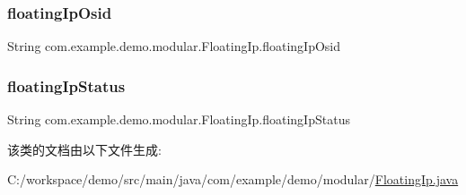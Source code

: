 \subsubsection{\texorpdfstring{floating\+Ip\+Osid}{floatingIpOsid}}
{\footnotesize\ttfamily String com.\+example.\+demo.\+modular.\+Floating\+Ip.\+floating\+Ip\+Osid\hspace{0.3cm}{\ttfamily [private]}}

\mbox{\label{classcom_1_1example_1_1demo_1_1modular_1_1_floating_ip_a5775e23db8a5f08b9ea99ca9ed55be12}} 
\subsubsection{\texorpdfstring{floating\+Ip\+Status}{floatingIpStatus}}
{\footnotesize\ttfamily String com.\+example.\+demo.\+modular.\+Floating\+Ip.\+floating\+Ip\+Status\hspace{0.3cm}{\ttfamily [private]}}



该类的文档由以下文件生成\+:\begin{DoxyCompactItemize}
\item 
C\+:/workspace/demo/src/main/java/com/example/demo/modular/\mbox{\hyperlink{_floating_ip_8java}{Floating\+Ip.\+java}}\end{DoxyCompactItemize}
